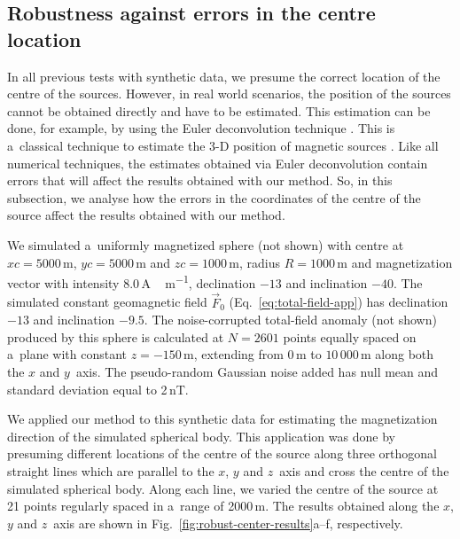 \documentclass[journal abbreviation, npg]{copernicus}
\begin{document}
\subsection{Robustness against errors in the centre location}

In all previous tests with synthetic data, we presume the correct location of
the centre of the sources. However, in real world scenarios, the position of
the sources cannot be obtained directly and have to be estimated. This
estimation can be done, for example, by using the Euler deconvolution
technique \citep{thompson1982,reid-etal1990}. This is a~classical technique
to estimate the 3-D position of magnetic sources
\citep{reid-etal2014,uieda-etal2014}. Like all numerical techniques, the
estimates obtained via Euler deconvolution contain errors that will affect
the results obtained with our method. So, in this subsection, we analyse how
the errors in the coordinates of the centre of the source affect the results
obtained with our method.

We simulated a~uniformly magnetized sphere (not shown) with centre at $xc =
5000$\,\unit{m}, $yc = 5000$\,\unit{m} and $zc = 1000$\,\unit{m}, radius $R =
1000$\,\unit{m} and magnetization vector with intensity
$8.0$\,\unit{A\,m^{-1}}, declination $-13${\degree} and inclination
$-40${\degree}. The simulated constant geomagnetic field $\vec{F}_{0}$
(Eq.~\ref{eq:total-field-app}) has declination $-13${\degree} and inclination
$-9.5${\degree}. The noise-corrupted total-field anomaly (not shown) produced
by this sphere is calculated at $N = 2601$ points equally spaced on a~plane
with constant $z=-150$\,\unit{m}, extending from $0$\,\unit{m} to
$10\,000$\,\unit{m} along both the $x$ and $y$~axis. The pseudo-random
Gaussian noise added has null mean and standard deviation equal to 2\,nT.

We applied our method to this synthetic data for estimating the magnetization
direction of the simulated spherical body. This application was done by
presuming different locations of the centre of the source along three
orthogonal straight lines which are parallel to the $x$, $y$ and $z$~axis and
cross the centre of the simulated spherical body. Along each line, we varied
the centre of the source at 21 points regularly spaced in a~range of
2000\,\unit{m}. The results obtained along the $x$, $y$ and $z$~axis are
shown in Fig.~\ref{fig:robust-center-results}a--f, respectively.
\end{document}
